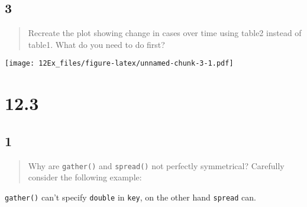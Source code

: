 \documentclass[]{ltjsarticle}
\newenvironment{Shaded}{\begin{snugshade}}{\end{snugshade}}
\newcommand{\DataTypeTok}[1]{\textcolor[rgb]{0.13,0.29,0.53}{#1}}
\newcommand{\KeywordTok}[1]{\textcolor[rgb]{0.13,0.29,0.53}{\textbf{#1}}}
\newcommand{\NormalTok}[1]{#1}
\newcommand{\OperatorTok}[1]{\textcolor[rgb]{0.81,0.36,0.00}{\textbf{#1}}}
\newcommand{\StringTok}[1]{\textcolor[rgb]{0.31,0.60,0.02}{#1}}
\begin{document}
\hypertarget{section-3}{%
\subsection{3}\label{section-3}}

\begin{quote}
Recreate the plot showing change in cases over time using table2 instead
of table1. What do you need to do first?
\end{quote}

\begin{Shaded}
\end{Shaded}

\texttt{[image: 12Ex\_files/figure-latex/unnamed-chunk-3-1.pdf]}

\hypertarget{section-4}{%
\section{12.3}\label{section-4}}

\hypertarget{section-5}{%
\subsection{1}\label{section-5}}

\begin{quote}
Why are \texttt{gather()} and \texttt{spread()} not perfectly
symmetrical? Carefully consider the following example:
\end{quote}

\texttt{gather()} can't specify \texttt{double} in \texttt{key}, on the
other hand \texttt{spread} can.
\end{document}
